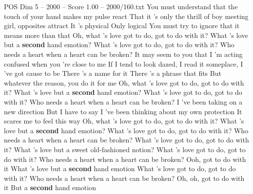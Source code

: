 \begin{textsample}{POS Dim 5 – 2000 – Score 1.00 – 2000/160.txt}  \label{ex:f5_pos_005}
You must understand that the touch of your hand makes my pulse react That it 's only the thrill of boy meeting girl, opposites attract It 's physical Only logical You must try to ignore that it means more than that Oh, what 's love got to do, got to do with it?
What 's love but a \textbf{second} hand emotion?
What 's love got to do, got to do with it?
Who needs a heart when a heart can be broken?
It may seem to you that I 'm acting confused when you 're close to me If I tend to look dazed, I read it someplace, I 've got cause to be There 's a name for it There 's a phrase that fits But whatever the reason, you do it for me Oh, what 's love got to do, got to do with it?
What 's love but a \textbf{second} hand emotion?
What 's love got to do, got to do with it?
Who needs a heart when a heart can be broken?
I 've been taking on a new direction But I have to say I 've been thinking about my own protection It scares me to feel this way Oh, what 's love got to do, got to do with it?
What 's love but a \textbf{second} hand emotion?
What 's love got to do, got to do with it?
Who needs a heart when a heart can be broken?
What 's love got to do, got to do with it?
What 's love but a sweet old-fashioned notion?
What 's love got to do, got to do with it?
Who needs a heart when a heart can be broken?
Ooh, got to do with it What 's love but a \textbf{second} hand emotion What 's love got to do, got to do with it?
Who needs a heart when a heart can be broken?
Oh, oh, got to do with it But a \textbf{second} hand emotion

\end{textsample}
